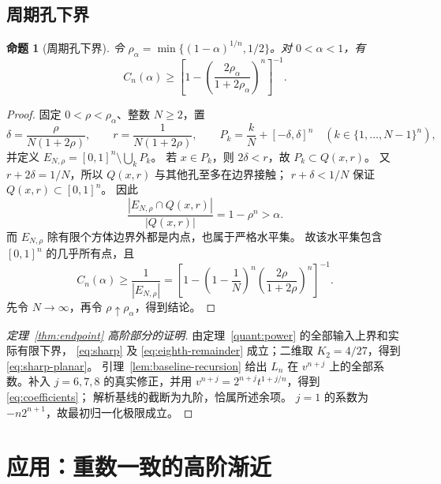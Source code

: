 \documentclass[UTF8,11pt,fontset=none]{ctexart}
\newtheorem{proposition}[theorem]{命题}
\theoremstyle{remark}
\newcommand{\Cn}{C_n}
\begin{document}
\subsection{周期孔下界}

\begin{proposition}[周期孔下界]\label{prop:lower}
令 \(\rho_\alpha=\min\{(1-\alpha)^{1/n},1/2\}\)。对 \(0<\alpha<1\)，有
\[
 \Cn(\alpha)\ge
 \left[1-\left(\frac{2\rho_\alpha}{1+2\rho_\alpha}\right)^n\right]^{-1}.
\]
\end{proposition}
\begin{proof}
固定 \(0<\rho<\rho_\alpha\)、整数 \(N\ge2\)，置
\[
 \delta=\frac{\rho}{N(1+2\rho)},\qquad
 r=\frac1{N(1+2\rho)},\qquad
 P_k=\frac{k}{N}+[-\delta,\delta]^n
 \quad(k\in\{1,\ldots,N-1\}^n),
\]
并定义 \(E_{N,\rho}=[0,1]^n\setminus\bigcup_kP_k\)。
若 \(x\in P_k\)，则 \(2\delta<r\)，故 \(P_k\subset Q(x,r)\)。
又 \(r+2\delta=1/N\)，所以 \(Q(x,r)\) 与其他孔至多在边界接触；
\(r+\delta<1/N\) 保证 \(Q(x,r)\subset[0,1]^n\)。
因此
\[
 \frac{|E_{N,\rho}\cap Q(x,r)|}{|Q(x,r)|}=1-\rho^n>\alpha.
\]
而 \(E_{N,\rho}\) 除有限个方体边界外都是内点，也属于严格水平集。
故该水平集包含 \([0,1]^n\) 的几乎所有点，且
\[
 \Cn(\alpha)\ge\frac1{|E_{N,\rho}|}
 =\left[1-\left(1-\frac1N\right)^n
             \left(\frac{2\rho}{1+2\rho}\right)^n\right]^{-1}.
\]
先令 \(N\to\infty\)，再令 \(\rho\uparrow\rho_\alpha\)，得到结论。
\end{proof}









\begin{proof}[定理~\ref{thm:endpoint} 高阶部分的证明]
由定理~\ref{quant:power} 的全部输入上界和实际有限下界，
\eqref{eq:sharp} 及 \eqref{eq:eighth-remainder} 成立；二维取 \(K_2=4/27\)，得到 \eqref{eq:sharp-planar}。
引理~\ref{lem:baseline-recursion} 给出 \(L_n\) 在
\(v^{n+j}\) 上的全部系数。补入 \(j=6,7,8\) 的真实修正，并用
\(v^{n+j}=2^{n+j}t^{1+j/n}\)，得到 \eqref{eq:coefficients}；
解析基线的截断为九阶，恰属所述余项。
\(j=1\) 的系数为 \(-n2^{n+1}\)，故最初归一化极限成立。

\end{proof}

\section{应用：重数一致的高阶渐近}
\end{document}
